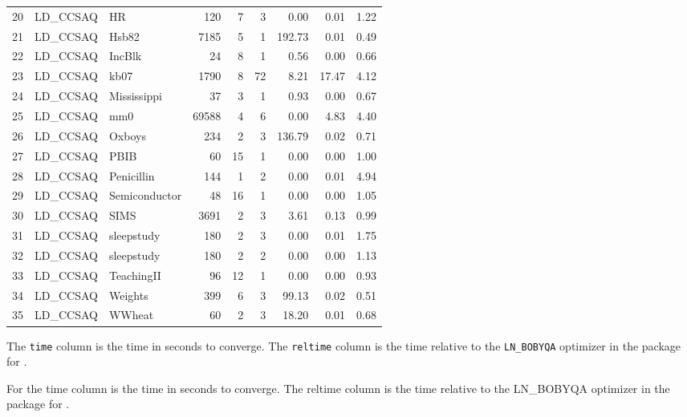 \documentclass[article]{jss}
\begin{document}
\begin{table}[htbp]
\begin{tabular}{rllrrrrrr}
  20 & LD\_CCSAQ & HR & 120 &   7 &   3 & 0.00 & 0.01 & 1.22 \\ 
  21 & LD\_CCSAQ & Hsb82 & 7185 &   5 &   1 & 192.73 & 0.01 & 0.49 \\ 
  22 & LD\_CCSAQ & IncBlk &  24 &   8 &   1 & 0.56 & 0.00 & 0.66 \\ 
  23 & LD\_CCSAQ & kb07 & 1790 &   8 &  72 & 8.21 & 17.47 & 4.12 \\ 
  24 & LD\_CCSAQ & Mississippi &  37 &   3 &   1 & 0.93 & 0.00 & 0.67 \\ 
  25 & LD\_CCSAQ & mm0 & 69588 &   4 &   6 & 0.00 & 4.83 & 4.40 \\ 
  26 & LD\_CCSAQ & Oxboys & 234 &   2 &   3 & 136.79 & 0.02 & 0.71 \\ 
  27 & LD\_CCSAQ & PBIB &  60 &  15 &   1 & 0.00 & 0.00 & 1.00 \\ 
  28 & LD\_CCSAQ & Penicillin & 144 &   1 &   2 & 0.00 & 0.01 & 4.94 \\ 
  29 & LD\_CCSAQ & Semiconductor &  48 &  16 &   1 & 0.00 & 0.00 & 1.05 \\ 
  30 & LD\_CCSAQ & SIMS & 3691 &   2 &   3 & 3.61 & 0.13 & 0.99 \\ 
  31 & LD\_CCSAQ & sleepstudy & 180 &   2 &   3 & 0.00 & 0.01 & 1.75 \\ 
  32 & LD\_CCSAQ & sleepstudy & 180 &   2 &   2 & 0.00 & 0.00 & 1.13 \\ 
  33 & LD\_CCSAQ & TeachingII &  96 &  12 &   1 & 0.00 & 0.00 & 0.93 \\ 
  34 & LD\_CCSAQ & Weights & 399 &   6 &   3 & 99.13 & 0.02 & 0.51 \\ 
  35 & LD\_CCSAQ & WWheat &  60 &   2 &   3 & 18.20 & 0.01 & 0.68 \\ 
   \hline
\end{tabular}
\end{table}




The \texttt{time} column is the time in seconds to converge. The
\texttt{reltime} column is the time relative to the \texttt{LN\_BOBYQA}
optimizer in the  package for .

For  the time column is the time in seconds to converge. The reltime column is the time relative to the LN_BOBYQA optimizer in the  package for .
\end{document}
